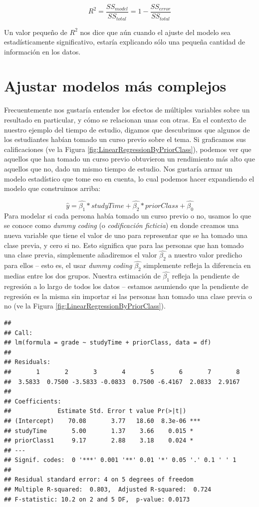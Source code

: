 \documentclass[
  12pt,
]{book}
\begin{document}
\[
R^2 = \frac{SS_{model}}{SS_{total}} = 1 - \frac{SS_{error}}{SS_{total}}
\]

Un valor pequeño de \(R^2\) nos dice que aún cuando el ajuste del modelo sea estadísticamente significativo, estaría explicando sólo una pequeña cantidad de información en los datos.

\hypertarget{ajustar-modelos-muxe1s-complejos}{%
\section{Ajustar modelos más complejos}\label{ajustar-modelos-muxe1s-complejos}}

Frecuentemente nos gustaría entender los efectos de múltiples variables sobre un resultado en particular, y cómo se relacionan unas con otras. En el contexto de nuestro ejemplo del tiempo de estudio, digamos que descubrimos que algunos de los estudiantes habían tomado un curso previo sobre el tema. Si graficamos sus calificaciones (ve la Figura \ref{fig:LinearRegressionByPriorClass}), podemos ver que aquellos que han tomado un curso previo obtuvieron un rendimiento más alto que aquellos que no, dado un mismo tiempo de estudio. Nos gustaría armar un modelo estadístico que tome eso en cuenta, lo cual podemos hacer expandiendo el modelo que construimos arriba:

\[
\hat{y} = \hat{\beta_1}*studyTime + \hat{\beta_2}*priorClass + \hat{\beta_0}
\]
Para modelar si cada persona había tomado un curso previo o no, usamos lo que se conoce como \emph{dummy coding} (o \emph{codificación ficticia}) en donde creamos una nueva variable que tiene el valor de uno para representar que se ha tomado una clase previa, y cero si no. Esto significa que para las personas que han tomado una clase previa, simplemente añadiremos el valor \(\hat{\beta_2}\) a nuestro valor predicho para ellos -- esto es, el usar \emph{dummy coding} \(\hat{\beta_2}\) simplemente refleja la diferencia en medias entre los dos grupos. Nuestra estimación de \(\hat{\beta_1}\) refleja la pendiente de regresión a lo largo de todos los datos -- estamos asumiendo que la pendiente de regresión es la misma sin importar si las personas han tomado una clase previa o no (ve la Figura \ref{fig:LinearRegressionByPriorClass}).

\begin{verbatim}
## 
## Call:
## lm(formula = grade ~ studyTime + priorClass, data = df)
## 
## Residuals:
##       1       2       3       4       5       6       7       8 
##  3.5833  0.7500 -3.5833 -0.0833  0.7500 -6.4167  2.0833  2.9167 
## 
## Coefficients:
##             Estimate Std. Error t value Pr(>|t|)    
## (Intercept)    70.08       3.77   18.60  8.3e-06 ***
## studyTime       5.00       1.37    3.66    0.015 *  
## priorClass1     9.17       2.88    3.18    0.024 *  
## ---
## Signif. codes:  0 '***' 0.001 '**' 0.01 '*' 0.05 '.' 0.1 ' ' 1
## 
## Residual standard error: 4 on 5 degrees of freedom
## Multiple R-squared:  0.803,	Adjusted R-squared:  0.724 
## F-statistic: 10.2 on 2 and 5 DF,  p-value: 0.0173
\end{verbatim}
\end{document}
